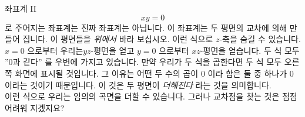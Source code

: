 \begin{surferPage}{좌표계 II}
\[xy=0\]
로 주어지는 좌표계는 진짜 좌표계는 아닙니다. 이 좌표계는 두 평면의 교차에 의해 만들어 집니다. 이 평면들을 {\it 위에서} 바라 보십시오. 이런 식으로 $z$-축을 숨길 수 있습니다. \\
\vspace{0.3cm}
$x=0$ 으로부터 우리는$yz$-평면을 얻고 $y=0$ 으로부터 $xz$-평면을 얻습니다.
두 식 모두 ''$0$과 같다'' 를 우변에 가지고 있습니다. 만약 우리가 두 식을 곱한다면 두 식 모두 오른쪽 화면에 표시될 것입니다. 그 이유는 어떤 두 수의 곱이 $0$ 이라 함은 둘 중 하나가 $0$ 이라는 것이기 때문입니다.  이 것은 두 평면이 {\it 더해진다} 라는 것을 의미합니다.\\
이런 식으로 우리는 임의의 곡면을 더할 수 있습니다. 그러나 교차점을 찾는 것은 점점 어려워 지겠지요?
\end{surferPage}
